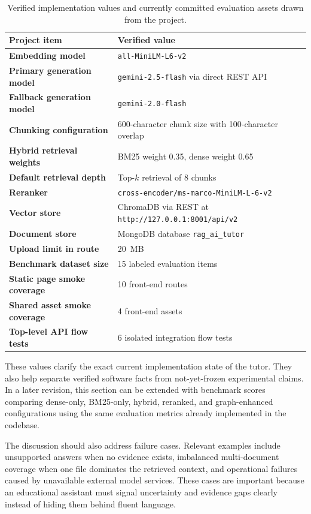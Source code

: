 \documentclass[11pt,a4paper]{article}
\begin{document}
\begin{table}[h!]
\centering
\small
\caption{Verified implementation values and currently committed evaluation assets drawn from the project.}
\begin{tabular}{|p{4.5cm}|p{8.0cm}|}
\hline
\textbf{Project item} & \textbf{Verified value} \\
\hline
\textbf{Embedding model} & \texttt{all-MiniLM-L6-v2} \\
\hline
\textbf{Primary generation model} & \texttt{gemini-2.5-flash} via direct REST API \\
\hline
\textbf{Fallback generation model} & \texttt{gemini-2.0-flash} \\
\hline
\textbf{Chunking configuration} & 600-character chunk size with 100-character overlap \\
\hline
\textbf{Hybrid retrieval weights} & BM25 weight 0.35, dense weight 0.65 \\
\hline
\textbf{Default retrieval depth} & Top-$k$ retrieval of 8 chunks \\
\hline
\textbf{Reranker} & \texttt{cross-encoder/ms-marco-MiniLM-L-6-v2} \\
\hline
\textbf{Vector store} & ChromaDB via REST at \texttt{http://127.0.0.1:8001/api/v2} \\
\hline
\textbf{Document store} & MongoDB database \texttt{rag\_ai\_tutor} \\
\hline
\textbf{Upload limit in route} & 20~MB \\
\hline
\textbf{Benchmark dataset size} & 15 labeled evaluation items \\
\hline
\textbf{Static page smoke coverage} & 10 front-end routes \\
\hline
\textbf{Shared asset smoke coverage} & 4 front-end assets \\
\hline
\textbf{Top-level API flow tests} & 6 isolated integration flow tests \\
\hline
\end{tabular}
\label{tab:results}
\end{table}

These values clarify the exact current implementation state of the tutor. They also help separate verified software facts from not-yet-frozen experimental claims. In a later revision, this section can be extended with benchmark scores comparing dense-only, BM25-only, hybrid, reranked, and graph-enhanced configurations using the same evaluation metrics already implemented in the codebase.

The discussion should also address failure cases. Relevant examples include unsupported answers when no evidence exists, imbalanced multi-document coverage when one file dominates the retrieved context, and operational failures caused by unavailable external model services. These cases are important because an educational assistant must signal uncertainty and evidence gaps clearly instead of hiding them behind fluent language.
\end{document}
